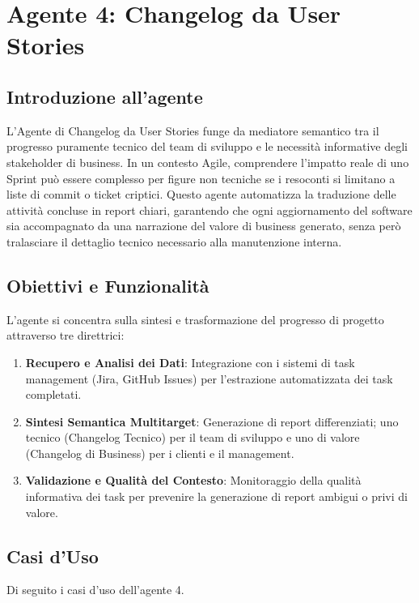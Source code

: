 \documentclass[12pt, a4paper]{article}
\begin{document}
\section{Agente 4: Changelog da User Stories}

\subsection{Introduzione all'agente}
L'Agente di Changelog da User Stories funge da mediatore semantico tra il progresso puramente tecnico del team di sviluppo e le necessità informative degli stakeholder di business. In un contesto Agile, comprendere l'impatto reale di uno Sprint può essere complesso per figure non tecniche se i resoconti si limitano a liste di commit o ticket criptici. Questo agente automatizza la traduzione delle attività concluse in report chiari, garantendo che ogni aggiornamento del software sia accompagnato da una narrazione del valore di business generato, senza però tralasciare il dettaglio tecnico necessario alla manutenzione interna.

\subsection{Obiettivi e Funzionalità}
L'agente si concentra sulla sintesi e trasformazione del progresso di progetto attraverso tre direttrici:
\begin{enumerate}
\item \textbf{Recupero e Analisi dei Dati}: Integrazione con i sistemi di task management (Jira, GitHub Issues) per l'estrazione automatizzata dei task completati.
\item \textbf{Sintesi Semantica Multitarget}: Generazione di report differenziati; uno tecnico (Changelog Tecnico) per il team di sviluppo e uno di valore (Changelog di Business) per i clienti e il management.
\item \textbf{Validazione e Qualità del Contesto}: Monitoraggio della qualità informativa dei task per prevenire la generazione di report ambigui o privi di valore.
\end{enumerate}

\subsection{Casi d'Uso}
Di seguito i casi d'uso dell'agente 4.
\end{document}
